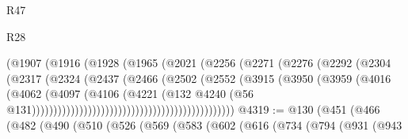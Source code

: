 \begin{lexlean}{R47}
\begin{lexlean}{R28}
\begin{coremodule}
{{{{{{{{{{{{{{{{{{{{{{{{{{{{{{{{{{{{{{{{{{{{{{{{{{{{{{{{{{{{{{{{{{{{{{{{{{{{{{{{{{{{{{{{{{{{{{{{{{{{{{{{{{{{{{{{{{{{{{{{{{{{{{{{{{{{{                                              (@1907
                                                (@1916
                                                  (@1928
                                                    (@1965
                                                      (@2021
                                                        (@2256
                                                          (@2271
                                                            (@2276
                                                              (@2292
                                                                (@2304
                                                                  (@2317
                                                                    (@2324
                                                                      (@2437
                                                                        (@2466
                                                                          (@2502
                                                                            (@2552
                                                                              (@3915
                                                                                (@3950
                                                                                  (@3959
                                                                                    (@4016
                                                                                      (@4062
                                                                                        (@4097
                                                                                          (@4106
                                                                                            (@4221
                                                                                              (@132
                                                                                                @4240
                                                                                                (@56
                                                                                                  @131)))))))))))))))))))))))))))))))))))))))))))))))
@4319 := @130
    (@451
      (@466
        (@482
          (@490
            (@510
              (@526
                (@569
                  (@583
                    (@602
                      (@616
                        (@734
                          (@794
                            (@931
                              (@943
}}}}}}}}}}}}}}}}}}}}}}}}}}}}}}}}}}}}}}}}}}}}}}}}}}}}}}}}}}}}}}}}}}}}}}}}}}}}}}}}}}}}}}}}}}}}}}}}}}}}}}}}}}}}}}}}}}}}}}}}}}}}}}}}}}}}}
\end{coremodule}
\end{lexlean}
\end{lexlean}
